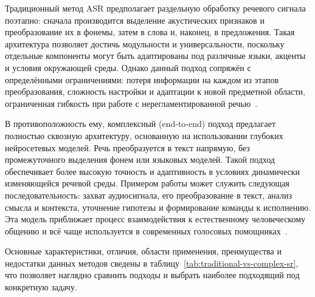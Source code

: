 Традиционный метод ASR предполагает раздельную обработку речевого сигнала поэтапно: сначала производится выделение акустических признаков и преобразование их в фонемы, затем в слова и, наконец, в предложения. Такая архитектура позволяет достичь модульности и универсальности, поскольку отдельные компоненты могут быть адаптированы под различные языки, акценты и условия окружающей среды. Однако данный подход сопряжён с определёнными ограничениями: потеря информации на каждом из этапов преобразования, сложность настройки и адаптации к новой предметной области, ограниченная гибкость при работе с нерегламентированной речью~\cite{Khlopenkova}.

В противоположность ему, комплексный (end-to-end) подход предлагает полностью сквозную архитектуру, основанную на использовании глубоких нейросетевых моделей. Речь преобразуется в текст напрямую, без промежуточного выделения фонем или языковых моделей. Такой подход обеспечивает более высокую точность и адаптивность в условиях динамически изменяющейся речевой среды. Примером работы может служить следующая последовательность: захват аудиосигнала, его преобразование в текст, анализ смысла и контекста, уточнение гипотезы и формирование команды к исполнению. Эта модель приближает процесс взаимодействия к естественному человеческому общению и всё чаще используется в современных голосовых помощниках~\cite{Abougarair}.

Основные характеристики, отличия, области применения, преимущества и недостатки данных методов сведены в таблицу~\ref{tab:traditional-vs-complex-sr}, что позволяет наглядно сравнить подходы и выбрать наиболее подходящий под конкретную задачу.

